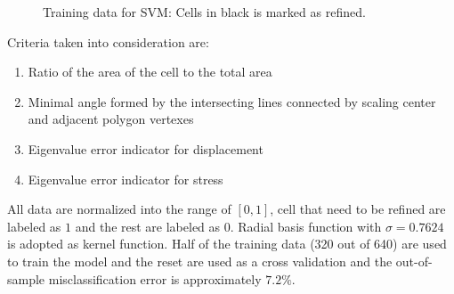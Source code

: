 \begin{figure}[!ht]
\begin{subfigure}[b]{0.49\linewidth}
{        }
    \end{subfigure}
    \begin{subfigure}[b]{0.49\linewidth}
    \end{subfigure}
    \caption[Training data for SVM]{Training data for SVM: Cells in black is marked as refined.}
    \label{adap_fig:svm_train_my}
\end{figure}

Criteria taken into consideration are: 
\begin{enumerate}
    \item Ratio of the area of the cell to the total area
    \item Minimal angle formed by the intersecting lines connected by scaling center and adjacent polygon vertexes
    \item Eigenvalue error indicator for displacement
    \item Eigenvalue error indicator for stress
\end{enumerate}
All data are normalized into the range of $[0,1]$, cell that need to be refined are labeled as $1$ and the rest are labeled as $0$.
Radial basis function with $\sigma=0.7624$ is adopted as kernel function.
Half of the training data (320 out of 640) are used to train the model and the reset are used as a cross validation and the out-of-sample misclassification error is approximately $7.2\%$.





\pagebreak
